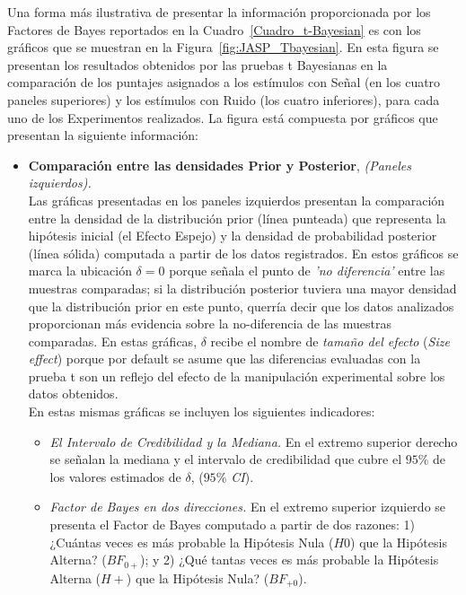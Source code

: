 Una forma más ilustrativa de presentar la información proporcionada por los Factores de Bayes reportados en la Cuadro~\ref{Cuadro_t-Bayesian} es con los gráficos que se muestran en la Figura~\ref{fig:JASP_Tbayesian}. En esta figura se presentan los resultados obtenidos por las pruebas t Bayesianas en la comparación de los puntajes asignados a los estímulos con Señal (en los cuatro paneles superiores) y los estímulos con Ruido (los cuatro inferiores), para cada uno de los Experimentos realizados. La figura está compuesta por gráficos que presentan la siguiente información:\\

\begin{itemize}
\item \textbf{Comparación entre las densidades Prior y Posterior}, \textit{(Paneles izquierdos).}\\

Las gráficas presentadas en los paneles izquierdos presentan la comparación entre la densidad de la distribución prior (línea punteada) que representa la hipótesis inicial (el Efecto Espejo) y la densidad de probabilidad posterior (línea sólida) computada a partir de los datos registrados. En estos gráficos se marca la ubicación $\delta = 0$ porque señala el punto de \textit{'no diferencia'} entre las muestras comparadas; si la distribución posterior tuviera una mayor densidad que la distribución prior en este punto, querría decir que los datos analizados proporcionan más evidencia sobre la no-diferencia de las muestras comparadas. En estas gráficas, $\delta$ recibe el nombre de \textit{tamaño del efecto} (\textit{\textit{Size effect}}) porque por default se asume que las diferencias evaluadas con la prueba t son un reflejo del efecto de la manipulación experimental sobre los datos obtenidos.\\ 

En estas mismas gráficas se incluyen los siguientes indicadores:\\

\begin{itemize}
	\item \textit{El Intervalo de Credibilidad y la Mediana.} En el extremo superior derecho se señalan la mediana y el intervalo de credibilidad que cubre el $95\%$ de los valores estimados de $\delta$, (\textit{$95\%$ CI}).

	\item \textit{Factor de Bayes en dos direcciones.} En el extremo superior izquierdo se presenta el Factor de Bayes computado a partir de dos razones: 1) ¿Cuántas veces es más probable la Hipótesis Nula ($H0$) que la Hipótesis Alterna? ($BF_{0+}$); y 2) ¿Qué tantas veces es más probable la Hipótesis Alterna ($H+$) que la Hipótesis Nula? ($BF_{+0}$).


\end{itemize}
\end{itemize}
